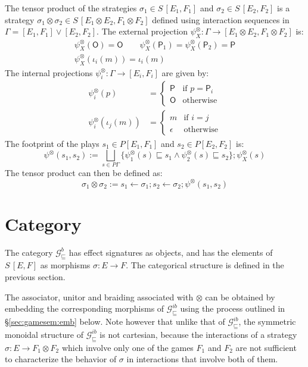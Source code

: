 \documentclass[11pt,oneside,draft]{book}
\theoremstyle{definition}
\newcommand{\gcat}{\mathcal{G}_{\sqsubseteq}}
\newcommand{\kw}[1]{\ensuremath{ \mathsf{#1} }}
\begin{document}
The tensor product of the strategies
$\sigma_1 \in S\,[E_1,F_1]$ and 
$\sigma_2 \in S\,[E_2,F_2]$
is a strategy
$\sigma_1 \otimes \sigma_2 \in S\,[E_1 \otimes E_2, F_1 \otimes F_2]$
defined using interaction sequences in
$\Gamma = [E_1,F_1] \vee [E_2,F_2]$.
The external projection
$\psi^\otimes_X : \Gamma \rightarrow [E_1 \otimes E_2, F_1 \otimes F_2]$
is:
\begin{gather*}
  \psi^\otimes_X(\kw{O}) = \kw{O} \qquad
  \psi^\otimes_X(\kw{P}_1) = \psi^\otimes_X(\kw{P}_2) = \kw{P} \\
  \psi^\otimes_X(\iota_i(m)) = \iota_i(m)
\end{gather*}
The internal projections
$\psi^\otimes_i : \Gamma \rightarrow [E_i, F_i]$
are given by:
\begin{align*}
  \psi^\otimes_i(p) &= \begin{cases}
    \kw{P} & \text{if } p = \kw{P}_i \\
    \kw{O} & \text{otherwise}
  \end{cases} \\
  \psi^\otimes_i(\iota_j(m)) &= \begin{cases}
    m & \text{if } i = j \\
    \epsilon & \text{otherwise}
  \end{cases}
\end{align*}
The footprint of the plays
$s_1 \in P [E_1,F_1]$ and $s_2 \in P [E_2, F_2]$
is:
\[
  \psi^\otimes(s_1, s_2) :=
  \bigsqcup_{s \in P \Gamma}
  \{ \psi^\otimes_1(s) \sqsubseteq s_1 \wedge
     \psi^\otimes_2(s) \sqsubseteq s_2 \} ;
  \psi^\otimes_X(s)
\]
The tensor product can then be defined as:
\[
  \sigma_1 \otimes \sigma_2 :=
  s_1 \leftarrow \sigma_1 ;
  s_2 \leftarrow \sigma_2 ;
  \psi^\otimes(s_1, s_2)
\]



\section{Category} \label{sec:gamesem:cat} %

The category $\gcat^b$
has effect signatures as objects,
and has the elements of $S \, [E,F]$
as morphisms $\sigma : E \rightarrow F$.
The categorical structure is
defined in the previous section.

The associator, unitor and braiding
associated with $\otimes$
can be obtained by embedding
the corresponding morphisms of $\gcat^{ib}$
using the process outlined in \S\ref{sec:gamesem:emb} below.
Note however that unlike that of $\gcat^{ib}$,
the symmetric monoidal structure of $\gcat^{ib}$
is not cartesian,
because the interactions of a strategy
$\sigma : E \rightarrow F_1 \otimes F_2$
which involve only one of the games $F_1$ and $F_2$
are not sufficient to characterize the behavior of $\sigma$
in interactions that involve both of them.
\end{document}
